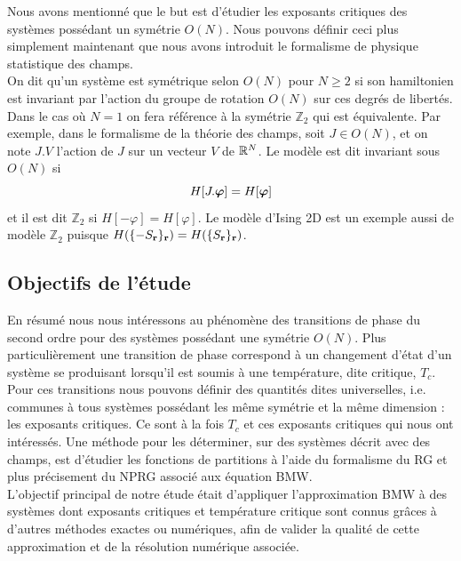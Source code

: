 \documentclass[10.5pt]{article}
\begin{document}
\begin{multicols*}{2}
Nous avons mentionné que le but est d'étudier les exposants critiques des systèmes possédant un symétrie $O(N)$. Nous pouvons définir ceci plus simplement maintenant que nous avons introduit le formalisme de physique statistique des champs. \\
 
On dit qu'un système est symétrique selon $O(N)$ pour $N \ge2 $ si son hamiltonien est invariant par l'action du groupe de rotation $O(N)$ sur ces degrés de libertés. Dans le cas où $N=1$ on fera référence à la symétrie $\mathbb{Z}_2$ qui est équivalente. Par exemple, dans le formalisme de la théorie des champs, soit $J \in O(N)$, et on note $J.V$ l'action de $J$ sur un vecteur $V$ de $\mathbb{R}^N$. Le modèle est dit invariant sous $O(N)$ si 
\begin{equation}
	H[J .\boldsymbol{ \varphi}] = H[\boldsymbol{ \varphi}]	 
\end{equation}
et il est dit $\mathbb{Z}_2$ si $H[-\varphi] = H[\varphi]$. Le modèle d'Ising 2D est un exemple aussi de modèle $\mathbb{Z}_2$ puisque $H( \{-S_{\bf r}\}_{\bf r}) = H( \{S_{\bf r}\}_{\bf r})$.

\vspace*{11pt}


\subsection{Objectifs de l'étude}


En résumé nous nous intéressons au phénomène des transitions de phase du second ordre pour des systèmes possédant une symétrie $O(N)$. Plus particulièrement une transition de phase correspond à un changement d'état d'un système se produisant lorsqu'il est soumis à une température, dite critique, $T_c$. Pour ces transitions nous pouvons définir des quantités dites universelles, i.e. communes à tous systèmes possédant les même symétrie et la même dimension : les exposants critiques. Ce sont à la fois $T_c$ et ces exposants critiques qui nous ont intéressés. Une méthode pour les déterminer, sur des systèmes décrit avec des champs, est d'étudier les fonctions de partitions à l'aide du formalisme du RG et plus précisement du NPRG associé aux équation BMW. \\


L'objectif principal de notre étude était d'appliquer l'approximation BMW à des systèmes dont exposants critiques et température critique sont connus grâces à d'autres méthodes exactes ou numériques, afin de valider la qualité de cette approximation et de la résolution numérique associée.\\



\end{multicols*}
\end{document}
